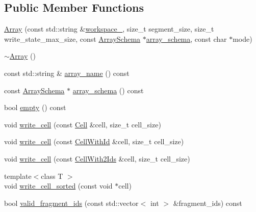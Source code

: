 \subsection*{Public Member Functions}
\begin{DoxyCompactItemize}
\item 
\hyperlink{classStorageManager_1_1Array_a34ccd40b341e34971888aad67cc26703}{Array} (const std\+::string \&\hyperlink{classStorageManager_1_1Array_ad83e2d64d928cb81ccd29c87a91d5c90}{workspace\+\_\+}, size\+\_\+t segment\+\_\+size, size\+\_\+t write\+\_\+state\+\_\+max\+\_\+size, const \hyperlink{classArraySchema}{Array\+Schema} $\ast$\hyperlink{classStorageManager_1_1Array_aa1850c5ddb91144695bd06e943987306}{array\+\_\+schema}, const char $\ast$mode)
\item 
\hyperlink{classStorageManager_1_1Array_af98b6bb426d8c6da3f8b2d4564a92061}{$\sim$\+Array} ()
\item 
const std\+::string \& \hyperlink{classStorageManager_1_1Array_a927402ef379bb5819fbab66661f57b56}{array\+\_\+name} () const 
\item 
const \hyperlink{classArraySchema}{Array\+Schema} $\ast$ \hyperlink{classStorageManager_1_1Array_aa1850c5ddb91144695bd06e943987306}{array\+\_\+schema} () const 
\item 
bool \hyperlink{classStorageManager_1_1Array_a5b4ddd07168ccbf6bffbedbe2a485974}{empty} () const 
\item 
void \hyperlink{classStorageManager_1_1Array_a8fe21da630a2e2d7ed91f99107107ed9}{write\+\_\+cell} (const \hyperlink{structStorageManager_1_1Cell}{Cell} \&cell, size\+\_\+t cell\+\_\+size)
\item 
void \hyperlink{classStorageManager_1_1Array_a958b182622c7db818d809d2ece793237}{write\+\_\+cell} (const \hyperlink{structStorageManager_1_1CellWithId}{Cell\+With\+Id} \&cell, size\+\_\+t cell\+\_\+size)
\item 
void \hyperlink{classStorageManager_1_1Array_a791cadced3979e081726ad286281269c}{write\+\_\+cell} (const \hyperlink{structStorageManager_1_1CellWith2Ids}{Cell\+With2\+Ids} \&cell, size\+\_\+t cell\+\_\+size)
\item 
{\footnotesize template$<$class T $>$ }\\void \hyperlink{classStorageManager_1_1Array_a26aff080590c2dfc886c1788c74f75a9}{write\+\_\+cell\+\_\+sorted} (const void $\ast$cell)
\item 
bool \hyperlink{classStorageManager_1_1Array_a88ca789c0dc5c7dd193504320c957e27}{valid\+\_\+fragment\+\_\+ids} (const std\+::vector$<$ int $>$ \&fragment\+\_\+ids) const 
\end{DoxyCompactItemize}
